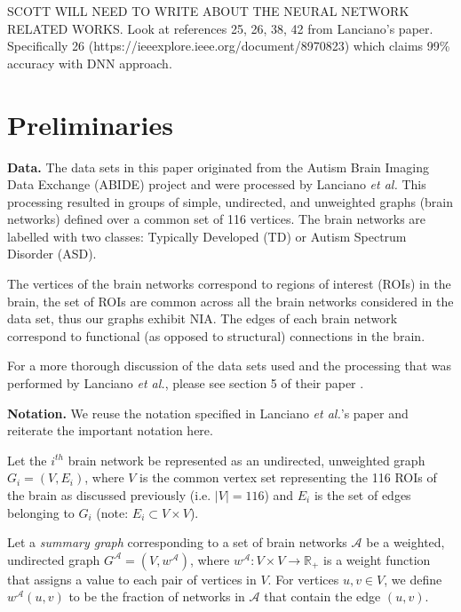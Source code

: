 \documentclass[letterpaper]{article}
\begin{document}
SCOTT WILL NEED TO WRITE ABOUT THE NEURAL NETWORK RELATED WORKS. Look at references 25, 26, 38, 42 from Lanciano's paper. Specifically 26 (https://ieeexplore.ieee.org/document/8970823) which claims 99\% accuracy with DNN approach.

\section{Preliminaries}
\textbf{Data.}
The data sets in this paper originated from the Autism Brain Imaging Data Exchange (ABIDE) project \cite{craddock2013} and were processed by Lanciano \emph{et al.}
This processing resulted in groups of simple, undirected, and unweighted graphs (brain networks) defined over a common set of 116 vertices.
The brain networks are labelled with two classes: Typically Developed (TD) or Autism Spectrum Disorder (ASD).

The vertices of the brain networks correspond to regions of interest (ROIs) in the brain, the set of ROIs are common across all the brain networks considered in the data set, thus our graphs exhibit NIA.
The edges of each brain network correspond to functional (as opposed to structural) connections in the brain.

For a more thorough discussion of the data sets used and the processing that was performed by Lanciano \emph{et al.}, please see section 5 of their paper \cite{lanciano2020}.

\textbf{Notation.}
We reuse the notation specified in Lanciano \emph{et al.}'s paper and reiterate the important notation here.

Let the $i^{th}$ brain network be represented as an undirected, unweighted graph $G_i = (V, E_i)$, where $V$ is the common vertex set representing the 116 ROIs of the brain as discussed previously (i.e. $|V| = 116$) and $E_i$ is the set of edges belonging to $G_i$ (note: $E_i \subset V \times V$).

Let a \emph{summary graph} corresponding to a set of brain networks $\mathcal{A}$ be a weighted, undirected graph $G^{\mathcal{A}} = (V, w^{\mathcal{A}})$, where $w^{\mathcal{A}}: V \times V \rightarrow \mathbb{R}_+$ is a weight function that assigns a value to each pair of vertices in $V$.
For vertices $u,v \in V$, we define $w^{\mathcal{A}}(u,v)$ to be the fraction of networks in $\mathcal{A}$ that contain the edge $(u,v)$.
\end{document}
